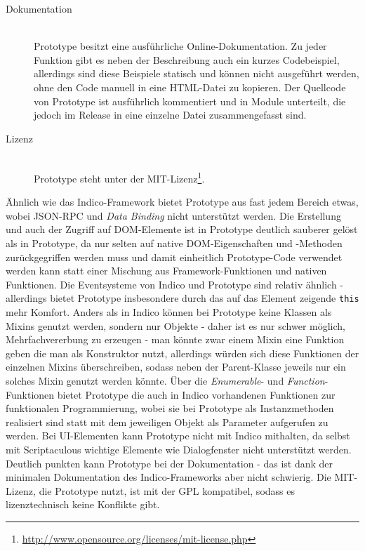 \begin{description}
\item[Dokumentation] \hfill \\
Prototype besitzt eine ausführliche Online-Dokumentation. Zu jeder Funktion gibt es neben der
Beschreibung auch ein kurzes Codebeispiel, allerdings sind diese Beispiele statisch und können nicht
ausgeführt werden, ohne den Code manuell in eine HTML-Datei zu kopieren. Der Quellcode von Prototype
ist ausführlich kommentiert und in Module unterteilt, die jedoch im Release in eine einzelne Datei
zusammengefasst sind.

\item[Lizenz] \hfill \\
Prototype steht unter der
MIT-Lizenz\footnote{\href{http://www.opensource.org/licenses/mit-license.php}{http://www.opensource.org/licenses/mit-license.php}}.
\end{description}

Ähnlich wie das Indico-Framework bietet Prototype aus fast jedem Bereich etwas, wobei JSON-RPC und
\emph{Data Binding} nicht unterstützt werden.
Die Erstellung und auch der Zugriff auf DOM-Elemente ist in Prototype deutlich sauberer gelöst als in
Prototype, da nur selten auf native DOM-Eigenschaften und -Methoden zurückgegriffen werden muss und
damit einheitlich Prototype-Code verwendet werden kann statt einer Mischung aus Framework-Funktionen
und nativen Funktionen. Die Eventsysteme von Indico und Prototype sind relativ ähnlich - allerdings
bietet Prototype insbesondere durch das auf das Element zeigende \lstinline{this} mehr Komfort.
Anders als in Indico können bei Prototype keine Klassen als Mixins genutzt werden, sondern nur
Objekte - daher ist es nur schwer möglich, Mehrfachvererbung zu erzeugen - man könnte zwar einem
Mixin eine Funktion geben die man als Konstruktor nutzt, allerdings würden sich diese Funktionen der
einzelnen Mixins überschreiben, sodass neben der Parent-Klasse jeweils nur ein solches Mixin genutzt
werden könnte. Über die \emph{Enumerable}- und \emph{Function}-Funktionen bietet Prototype die auch
in Indico vorhandenen Funktionen zur funktionalen Programmierung, wobei sie bei Prototype als
Instanzmethoden realisiert sind statt mit dem jeweiligen Objekt als Parameter aufgerufen zu werden.
Bei UI-Elementen kann Prototype nicht mit Indico mithalten, da selbst mit Scriptaculous wichtige
Elemente wie Dialogfenster nicht unterstützt werden. Deutlich punkten kann Prototype bei der
Dokumentation - das ist dank der minimalen Dokumentation des Indico-Frameworks aber nicht schwierig.
Die MIT-Lizenz, die Prototype nutzt, ist mit der GPL kompatibel, sodass es lizenztechnisch keine
Konflikte gibt.




